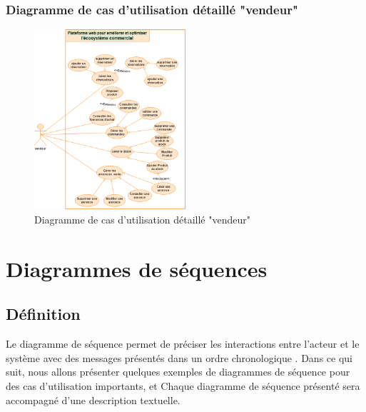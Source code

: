 \documentclass[edit,12pt,a4paper,ChapStyle,oneside,doubleinterligne]{report}
\begin{document}
\subsubsection{Diagramme de cas d'utilisation détaillé "vendeur" }
\begin{figure}[h!]\label{fig:Diagramme de cas d'utilisation détaillé "vendeur"}
\centering
\includegraphics[width=0.5\textwidth]{images/diagramme de cas ven.png}
\caption{Diagramme de cas d'utilisation détaillé "vendeur"}
\end{figure}
\newpage
\section{Diagrammes de séquences}
\subsection{Définition}
Le diagramme de séquence permet de préciser les interactions entre l'acteur et le système avec des messages présentés dans un ordre chronologique 
\cite{séquences}.
\newline Dans ce qui suit, nous allons présenter quelques exemples de diagrammes de séquence pour des cas d'utilisation importants, et Chaque diagramme de séquence présenté sera accompagné d'une description textuelle.
\end{document}
